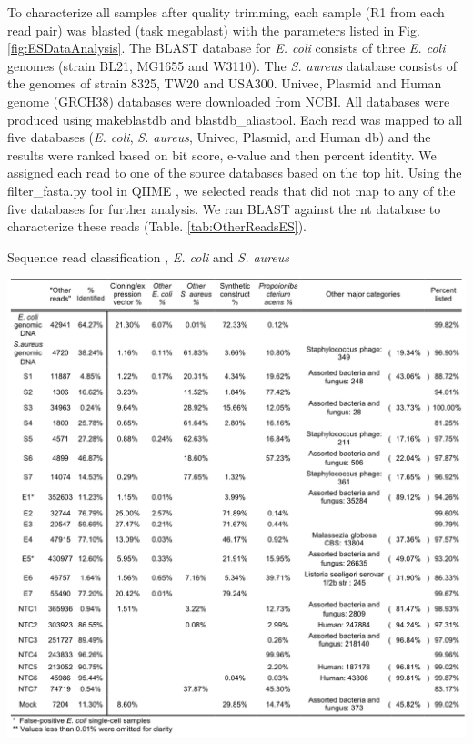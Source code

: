 To characterize all samples after quality trimming, each sample (R1 from each read pair) was blasted (task megablast) with the parameters listed in Fig. \ref{fig:ESDataAnalysis}. The BLAST database for \textit{E. coli} consists of three \textit{E. coli} genomes (strain BL21, MG1655 and W3110). The \textit{S. aureus} database consists of the genomes of strain 8325, TW20 and USA300. Univec, Plasmid and Human genome (GRCH38) databases were downloaded from NCBI. All databases were produced using makeblastdb and blastdb\_aliastool. Each read was mapped to all five databases (\textit{E. coli}, \textit{S. aureus}, Univec, Plasmid, and Human db) and the results were ranked based on bit score, e-value and then percent identity. We assigned each read to one of the source databases based on the top hit. Using the filter\_fasta.py tool in QIIME  \cite{Caporaso:2010jf}, we selected reads that did not map to any of the five databases for further analysis. We ran BLAST against the nt database to characterize these reads (Table. \ref{tab:OtherReadsES}). 

\begin{table}
\caption{Sequence read classification , \textit{E. coli} and \textit{S. aureus}}
\label{tab:OtherReadsES}
\begin{center}
\includegraphics[width=\linewidth]{./figures/OtherReadsClassificationES}
\end{center}
\end{table}

